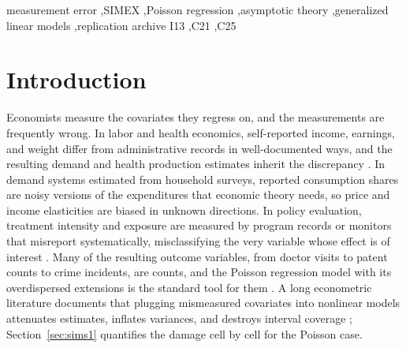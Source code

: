 \documentclass[3p,11pt]{elsarticle}
\theoremstyle{plain}
\theoremstyle{definition}
\begin{document}
\begin{frontmatter}
\begin{abstract}
\end{abstract}

\begin{keyword}
measurement error \sep SIMEX \sep Poisson regression \sep asymptotic
theory \sep generalized linear models \sep replication archive
\JEL I13 \sep C21 \sep C25
\end{keyword}

\end{frontmatter}

\section{Introduction}\label{sec:intro}

Economists measure the covariates they regress on, and the
measurements are frequently wrong. In labor and health economics,
self-reported income, earnings, and weight differ from administrative
records in well-documented ways, and the resulting demand and health
production estimates inherit the discrepancy
\citep{griliches1986,bound2001}. In demand systems estimated from
household surveys, reported consumption shares are noisy versions of
the expenditures that economic theory needs, so price and income
elasticities are biased in unknown directions. In policy evaluation,
treatment intensity and exposure are measured by program records or
monitors that misreport systematically, misclassifying the very
variable whose effect is of interest
\citep{mahajan2006,hu2008}. Many of the resulting outcome variables,
from doctor visits to patent counts to crime incidents, are counts,
and the Poisson regression model with its overdispersed extensions is
the standard tool for them \citep{mullahy1986,cameron2013,
winkelmann2008}. A long econometric literature documents that
plugging mismeasured covariates into nonlinear models attenuates
estimates, inflates variances, and destroys interval coverage
\citep{hausman2001,bound2001}; Section~\ref{sec:sims1} quantifies the
damage cell by cell for the Poisson case.
\end{document}
